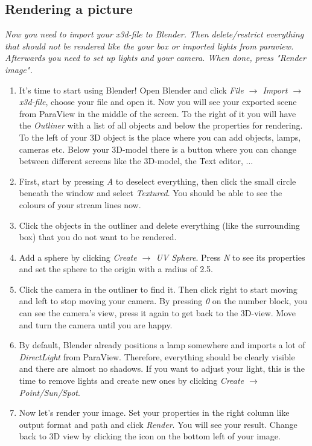 \documentclass[11pt,twoside,a4paper]{fdyartcl}
\theoremstyle{myPlain}
\theoremstyle{myDefinition}
\begin{document}
\subsection{Rendering a picture}
\textit{Now you need to import your x3d-file to Blender. Then delete/restrict everything that should not be rendered like the your box or imported lights from paraview. Afterwards you need to set up lights and your camera. When done, press "Render image".}

\begin{enumerate}
	\item It's time to start using Blender! Open Blender and click \textit{File $\rightarrow$ Import $\rightarrow$ x3d-file}, choose your file and open it. Now you will see your exported scene from ParaView in the middle of the screen. To the right of it you will have the \textit{Outliner} with a list of all objects and below the properties for rendering. To the left of your 3D object is the place where you can add objects, lamps, cameras etc. Below your 3D-model there is a button where you can change between different screens like the 3D-model, the Text editor, ...
	\item First, start by pressing \textit{A} to deselect everything, then click the small circle beneath the window and select \textit{Textured}. You should be able to see the colours of your stream lines now. 
	\item Click the objects in the outliner and delete everything (like the surrounding box) that you do not want to be rendered.
	\item Add a sphere by clicking \textit{Create $\rightarrow$ UV Sphere}. Press \textit{N} to see its properties and set the sphere to the origin with a radius of 2.5.
	\item Click the camera in the outliner to find it. Then click right to start moving and left to stop moving your camera. By pressing \textit{0} on the number block, you can see the camera's view, press it again to get back to the 3D-view. Move and turn the camera until you are happy. 
	\item By default, Blender already positions a lamp somewhere and imports a lot of \textit{DirectLight} from ParaView. Therefore, everything should be clearly visible and there are almost no shadows. If you want to adjust your light, this is the time to remove lights and create new ones by clicking \textit{Create $\rightarrow$ Point/Sun/Spot}.
	\item Now let's render your image. Set your properties in the right column like output format and path and click \textit{Render}. You will see your result. Change back to 3D view by clicking the icon on the bottom left of your image. 
\end{enumerate}
\end{document}
